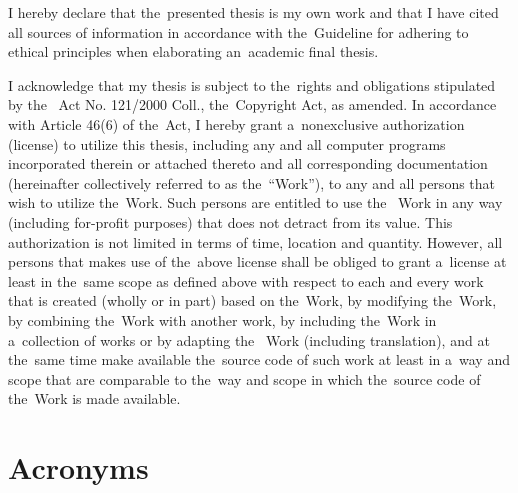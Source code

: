 \documentclass[english,bachelor,unicode]{ctufit-thesis}
\theoremstyle{plain}
\theoremstyle{definition}
\theoremstyle{remark}
\numberwithin{theorem}{chapter}
\begin{document}
\begin{declarationpage}
I hereby declare that the~presented thesis is my own work and that I have cited all 
sources of information in accordance with the~Guideline for adhering to ethical 
principles when elaborating an~academic final thesis.

I acknowledge that my thesis is subject to the~rights and obligations stipulated by the~
Act No. 121/2000 Coll., the~Copyright Act, as amended. In accordance with Article 46(6) 
of the~Act, I hereby grant a~nonexclusive authorization (license) to utilize this thesis, 
including any and all computer programs incorporated therein or attached thereto and 
all corresponding documentation (hereinafter collectively referred to as the~“Work”), to 
any and all persons that wish to utilize the~Work. Such persons are entitled to use the~
Work in any way (including for-profit purposes) that does not detract from its value.
This authorization is not limited in terms of time, location and quantity. However, all 
persons that makes use of the~above license shall be obliged to grant a~license at least 
in the~same scope as defined above with respect to each and every work that is created 
(wholly or in part) based on the~Work, by modifying the~Work, by combining the~Work 
with another work, by including the~Work in a~collection of works or by adapting the~
Work (including translation), and at the~same time make available the~source code of 
such work at least in a~way and scope that are comparable to the~way and scope in 
which the~source code of the~Work is made available.
\end{declarationpage}

\printabstractpage %


\chapter{Acronyms}
	
\end{document}

